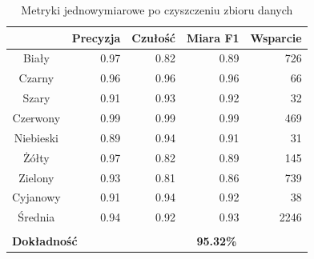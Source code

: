 \begin{table}[h!]
\begin{center}
\begin{tabular}{crrrr}
\cline{2-5}
\multicolumn{1}{c|}{}           & \multicolumn{1}{c|}{Precyzja} & \multicolumn{1}{c|}{Czułość} & \multicolumn{1}{c|}{Miara F1} & \multicolumn{1}{c|}{Wsparcie} \\ \hline
\multicolumn{1}{|c|}{Biały}     & \multicolumn{1}{r|}{0.97}     & \multicolumn{1}{r|}{0.82}    & \multicolumn{1}{r|}{0.89}     & \multicolumn{1}{r|}{726}      \\ \hline
\multicolumn{1}{|c|}{Czarny}    & \multicolumn{1}{r|}{0.96}     & \multicolumn{1}{r|}{0.96}    & \multicolumn{1}{r|}{0.96}     & \multicolumn{1}{r|}{66}       \\ \hline
\multicolumn{1}{|c|}{Szary}     & \multicolumn{1}{r|}{0.91}     & \multicolumn{1}{r|}{0.93}    & \multicolumn{1}{r|}{0.92}     & \multicolumn{1}{r|}{32}       \\ \hline
\multicolumn{1}{|c|}{Czerwony}  & \multicolumn{1}{r|}{0.99}     & \multicolumn{1}{r|}{0.99}    & \multicolumn{1}{r|}{0.99}     & \multicolumn{1}{r|}{469}      \\ \hline
\multicolumn{1}{|c|}{Niebieski} & \multicolumn{1}{r|}{0.89}     & \multicolumn{1}{r|}{0.94}    & \multicolumn{1}{r|}{0.91}     & \multicolumn{1}{r|}{31}       \\ \hline
\multicolumn{1}{|c|}{Żółty}     & \multicolumn{1}{r|}{0.97}     & \multicolumn{1}{r|}{0.82}    & \multicolumn{1}{r|}{0.89}     & \multicolumn{1}{r|}{145}      \\ \hline
\multicolumn{1}{|c|}{Zielony}   & \multicolumn{1}{r|}{0.93}     & \multicolumn{1}{r|}{0.81}    & \multicolumn{1}{r|}{0.86}     & \multicolumn{1}{r|}{739}      \\ \hline
\multicolumn{1}{|c|}{Cyjanowy}  & \multicolumn{1}{r|}{0.91}     & \multicolumn{1}{r|}{0.94}    & \multicolumn{1}{r|}{0.92}     & \multicolumn{1}{r|}{38}       \\ \hline
\multicolumn{1}{|c|}{Średnia}   & \multicolumn{1}{r|}{0.94}     & \multicolumn{1}{r|}{0.92}    & \multicolumn{1}{r|}{0.93}     & \multicolumn{1}{r|}{2246}     \\ \hline
\multicolumn{1}{l}{}            & \multicolumn{1}{l}{}          & \multicolumn{1}{l}{}         & \multicolumn{1}{l}{}          & \multicolumn{1}{l}{}          \\ \hline
\multicolumn{2}{|l|}{\textbf{Dokładność}}                       & \multicolumn{3}{c|}{\textbf{95.32\%}}                                                        \\ \hline
\end{tabular}
\caption{Metryki jednowymiarowe po czyszczeniu zbioru danych}
\label{tab:metrics_reword}
\end{center}
\end{table}

